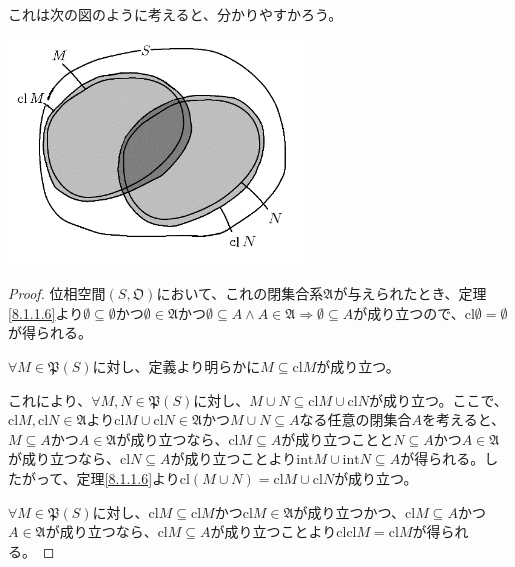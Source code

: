 \documentclass[dvipdfmx]{jsarticle}
\begin{document}
これは次の図のように考えると、分かりやすかろう。
\begin{center}
  \includegraphics[width=80mm]{8.1.1.e.png}
\end{center}
\begin{proof}
位相空間$\left( S,\mathfrak{O} \right)$において、これの閉集合系$\mathfrak{A}$が与えられたとき、定理\ref{8.1.1.6}より$\emptyset \subseteq \emptyset$かつ$\mathfrak{\emptyset \in A}$かつ$\emptyset \subseteq A \land A \in \mathfrak{A} \Rightarrow \emptyset \subseteq A$が成り立つので、${\mathrm{cl}}\emptyset = \emptyset$が得られる。\par
$\forall M \in \mathfrak{P}(S)$に対し、定義より明らかに$M \subseteq {\mathrm{cl}}M$が成り立つ。\par
これにより、$\forall M,N \in \mathfrak{P}(S)$に対し、$M \cup N \subseteq {\mathrm{cl}}M \cup {\mathrm{cl}}N$が成り立つ。ここで、${\mathrm{cl}}M,{\mathrm{cl}}N\in \mathfrak{A}$より${\mathrm{cl}}M \cup {\mathrm{cl}}N\in \mathfrak{A}$かつ$M \cup N \subseteq A$なる任意の閉集合$A$を考えると、$M \subseteq A$かつ$A \in \mathfrak{A}$が成り立つなら、${\mathrm{cl}}M \subseteq A$が成り立つことと$N \subseteq A$かつ$A \in \mathfrak{A}$が成り立つなら、${\mathrm{cl}}N \subseteq A$が成り立つことより${\mathrm{int}}M \cup {\mathrm{int}}N \subseteq A$が得られる。したがって、定理\ref{8.1.1.6}より${\mathrm{cl}}(M \cup N) = {\mathrm{cl}}M \cup {\mathrm{cl}}N$が成り立つ。\par
$\forall M\in \mathfrak{P}(S)$に対し、${\mathrm{cl}}M \subseteq {\mathrm{cl}}M$かつ${\mathrm{cl}}M\in \mathfrak{A}$が成り立つかつ、${\mathrm{cl}}M \subseteq A$かつ$A \in \mathfrak{A}$が成り立つなら、${\mathrm{cl}}M \subseteq A$が成り立つことより${\mathrm{cl}}{{\mathrm{cl}}M} = {\mathrm{cl}}M$が得られる。
\end{proof}
\end{document}
